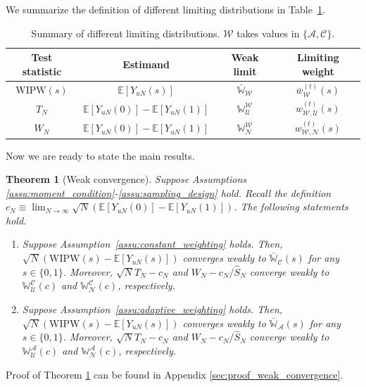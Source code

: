 \documentclass[12pt]{article}
\newtheorem{theorem}{Theorem}
\newcommand{\E}{\mathbb E}								%
\newcommand{\WIPW}{\mathrm{WIPW}}
\begin{document}
We summarize the definition of different limiting distributions in Table~\ref{tab:limit-dist}. 
\small
\begin{table}[!ht]
	\centering
	\caption{Summary of different limiting distributions. $\mathcal{W}$ takes values in $\{\mathcal{A},\mathcal{C}\}$.}
	\label{tab:limit-dist}
	\begin{tabular}{c|c|c|c}
	  \textbf{Test statistic} &  \textbf{Estimand} & \textbf{Weak limit} & \textbf{Limiting weight} \\
	  \hline
	  $\WIPW(s)$ & $\E[Y_{uN}(s)]$  & $\bar{\mathbb{W}}_{\mathcal{W}}$ & $\bar{w}^{(t)}_{\mathcal{W}}(s)$ \\
	  $T_N$ & $\E[Y_{uN}(0)]-\E[Y_{uN}(1)]$  & $\mathbb{W}_{\mathcal{U}}^{\mathcal{W}}$ & $w^{(t)}_{\mathcal{W},\mathcal{U}}(s)$   \\
	  $W_N$ & $\E[Y_{uN}(0)]-\E[Y_{uN}(1)]$ & $\mathbb{W}_{\mathcal{N}}^{\mathcal{W}}$ & $w^{(t)}_{\mathcal{W},\mathcal{N}}(s)$ \\
	\end{tabular}
\end{table} 
\normalsize


Now we are ready to state the main results.

\begin{theorem}[Weak convergence]\label{thm:weak_convergence_W_N}
	Suppose Assumptions \ref{assu:moment_condition}-\ref{assu:sampling_design} hold. Recall the definition $c_N\equiv \lim_{N\rightarrow\infty}\sqrt{N}(\E[Y_{uN}(0)]-\E[Y_{uN}(1)])$. The following statements hold.
	\begin{enumerate}
		\item Suppose Assumption~\ref{assu:constant_weighting} holds. Then, $\sqrt{N}(\WIPW(s)-\E[Y_{uN}(s)])$ converges weakly to $\bar{\mathbb{W}}_{\mathcal{C}}(s)$ for any $s\in\{0,1\}$. Moreover, $\sqrt{N}T_N-c_N$ and $W_N - c_N/\hat S_N$ converge weakly to $\mathbb{W}_{\mathcal{U}}^{\mathcal{C}}(c)$ and $\mathbb{W}_{\mathcal{N}}^{\mathcal{C}}(c)$, respectively.
		\item Suppose Assumption~\ref{assu:adaptive_weighting} holds. Then, $\sqrt{N}(\WIPW(s)-\E[Y_{uN}(s)])$ converges weakly to $\bar{\mathbb{W}}_{\mathcal{A}}(s)$ for any $s\in\{0,1\}$. Moreover, $\sqrt{N}T_N-c_N$ and $W_N - c_N/\hat S_N$ converge weakly to $\mathbb{W}_{\mathcal{U}}^{\mathcal{A}}(c)$ and $\mathbb{W}_{\mathcal{N}}^{\mathcal{A}}(c)$, respectively.
	\end{enumerate}
\end{theorem}

\noindent Proof of Theorem \ref{thm:weak_convergence_W_N} can be found in Appendix \ref{sec:proof_weak_convergence}. 
\end{document}
